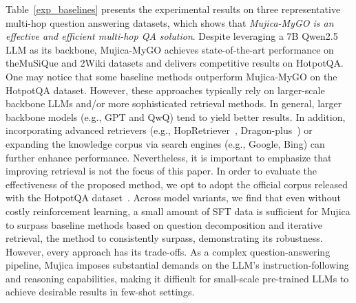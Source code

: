 Table~\ref{exp_baselines} presents the experimental results on three representative multi-hop question answering datasets, which shows that \textit{Mujica-MyGO is an effective and efficient multi-hop QA solution}. Despite leveraging a 7B Qwen2.5 LLM as its backbone, Mujica-MyGO achieves state-of-the-art performance on the\allowbreak MuSiQue and 2Wiki datasets and delivers competitive results on HotpotQA. 
One may notice that some baseline methods outperform Mujica-MyGO on the HotpotQA dataset. However, these approaches typically rely on larger-scale backbone LLMs and/or more sophisticated retrieval methods. In general, larger backbone models (e.g., GPT and QwQ) tend to yield better results. 
In addition, incorporating advanced retrievers (e.g., HopRetriever~\cite{HopRetriever}, Dragon-plus~\cite{DRAGON}) or expanding the knowledge corpus via search engines (e.g., Google, Bing) can further enhance performance. Nevertheless, it is important to emphasize that improving retrieval is not the focus of this paper. In order to evaluate the effectiveness of the proposed method, we opt to adopt the official corpus released with the HotpotQA dataset~\cite{yang2018hotpotqa}. Across model variants, we find that even without costly reinforcement learning, a small amount of SFT data is sufficient for Mujica to surpass baseline methods based on question decomposition and iterative retrieval, the method to consistently surpass, demonstrating its robustness. However, every approach has its trade-offs. As a complex question-answering pipeline, Mujica imposes substantial demands on the LLM's instruction-following and reasoning capabilities, making it difficult for small-scale pre-trained LLMs to achieve desirable results in few-shot settings.

